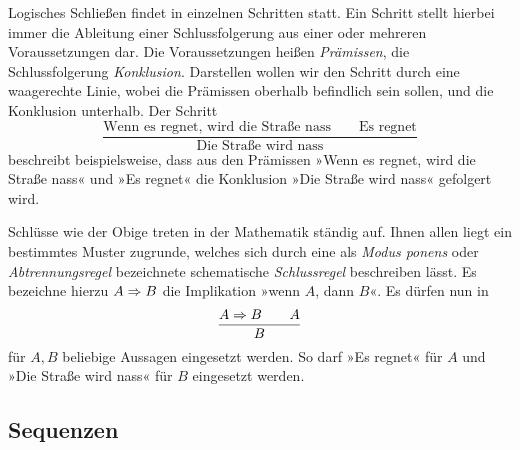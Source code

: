 

Logisches Schließen findet in einzelnen Schritten statt. Ein Schritt
stellt hierbei immer die Ableitung einer Schlussfolgerung aus einer
oder mehreren Voraussetzungen dar. Die Voraussetzungen heißen
\emph{Prämissen}, die Schlussfolgerung
\emph{Konklusion}. Darstellen wollen wir den Schritt
durch eine waagerechte Linie, wobei die Prämissen oberhalb befindlich
sein sollen, und die Konklusion unterhalb. Der Schritt
\[\dfrac{\text{Wenn es regnet, wird die Straße nass}\qquad\text{Es regnet}}
{\text{Die Straße wird nass}}\]
beschreibt beispielsweise, dass aus den Prämissen »Wenn es regnet, wird
die Straße nass« und »Es regnet« die Konklusion »Die Straße wird nass«
gefolgert wird.

Schlüsse wie der Obige treten in der Mathematik ständig auf. Ihnen allen
liegt ein bestimmtes Muster zugrunde, welches sich durch eine als
\emph{Modus ponens} oder
\emph{Abtrennungsregel}
bezeichnete schematische \emph{Schlussregel}
beschreiben lässt. Es bezeichne hierzu $A\Rightarrow B$ die Implikation
»wenn $A$, dann $B$«. Es dürfen nun in
\[\dfrac{A\Rightarrow B\qquad A}{B}\]
für $A,B$ beliebige Aussagen eingesetzt werden. So darf »Es regnet«
für $A$ und »Die Straße wird nass« für $B$ eingesetzt werden.

\subsection{Sequenzen}

